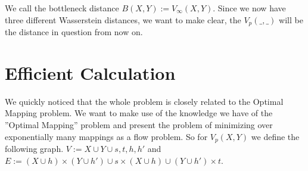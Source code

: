 \documentclass[11pt, a4paper,draft]{report}
\begin{document}
We call the bottleneck distance $B(X,Y) := V_\infty(X,Y)$. Since we now have three different Wasserstein distances, we want to make clear, the $V_p(\_,\_)$ will be the distance in question from now on. 
 	
 	\section{Efficient Calculation}
 	
We quickly noticed that the whole problem is closely related to the Optimal Mapping problem. We want to make use of the knowledge we have of the ''Optimal Mapping'' problem and present the problem of minimizing over exponentially many mappings as a flow problem. So for $V_p(X,Y)$ we define the following graph. $V := X\cup Y\cup {s,t,h,h'}$ and $E := (X\cup h)\times (Y\cup h') \cup {s}\times (X\cup h) \cup (Y\cup h')\times t$.\\
\end{document}
